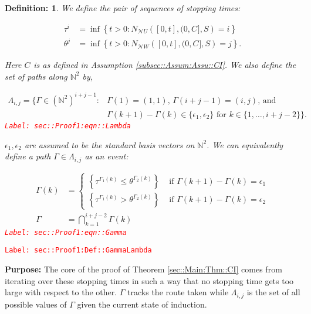 \documentclass[12pt]{article}
\newcommand{\mb}{\mathbb}
\newcommand{\mc}{\mathcal}
\newcommand{\te}{\text}
\newcommand{\ep}{\epsilon}
\newcommand{\tr}{\textcolor{red}}
\newcommand{\labe}[1]{\tr{\texttt{Label: #1}}}
\newcommand{\purpose}{\textbf{Purpose: }}
\newcommand{\neigh}{\mc{N}}					%
\renewcommand{\U}{U}							%
\newcommand{\UU}{W}								%
\renewcommand{\S}{S}							%
\newcommand{\ev}[1]{\ep_{#1}}					%
\renewcommand{\t}{t}							%
\newcommand{\poiss}[1]{N_{#1}}						%
\newcommand{\rt}[1]{\tau^{#1}}						%
\newcommand{\rtt}[1]{\theta^{#1}}					%
\renewcommand{\it}{k}								%
\newcommand{\itt}{i}								%
\newcommand{\ittt}{j}								%
\newcommand{\const}[1]{C_{#1}}						%
\newcommand{\apath}{\Gamma}						%
\newcommand{\pathset}[2]{\Lambda_{#1,#2}}			%
\newtheorem{defn}[thms]{Definition: }
\begin{document}
\begin{defn}
We define the pair of sequences of stopping times:

\begin{align*}
\rt{\itt} &= \inf \left\{\t > 0: \poiss{\neigh{\U}}\left([0,\t],(0,\const{}],\S\right) = \itt\right\}\\
\rtt{\ittt} &= \inf \left\{\t > 0: \poiss{\neigh{\UU}}\left([0,\t],(0,\const{}],\S\right) = \ittt\right\}.
\end{align*}

Here \(\const{}\) is as defined in Assumption \ref{subsec::Assum:Assu::CI}. We also define the set of paths along \(\mb{N}^2\) by,

\begin{align}
\pathset{\itt}{\ittt} = \{\apath \in (\mb{N}^2)^{\itt+\ittt-1}: &\apath(1) = (1,1)\te{, } \apath(\itt+\ittt-1) = (\itt,\ittt)\te{, and } \nonumber\\
&\Gamma(\it+1) - \Gamma(\it)\in \{\ev{1},\ev{2}\}\te{ for }\it\in \{1,\dots, \itt+\ittt-2\}\}.
\label{sec::Proof1:eqn::Lambda}
\end{align}
\labe{sec::Proof1:eqn::Lambda}

\(\ev{1},\ev{2}\) are assumed to be the standard basis vectors on \(\mb{N}^2\). We can equivalently define a path \(\apath \in \pathset{\itt}{\ittt}\) as an event:

\begin{align}
\apath(\it) &= \begin{cases}
\left\{\rt{\apath_1(\it)} \leq \rtt{\apath_2(\it)}\right\} &\te{ if } \apath(\it+1) - \apath(\it) = \ev{1}\\
\left\{\rt{\apath_1(\it)} > \rtt{\apath_2(\it)}\right\} &\te{ if } \apath(\it+1) - \apath(\it) = \ev{2}
\end{cases}\\
\apath &= \bigcap_{\it=1}^{\itt+\ittt-2} \apath(\it)
\label{sec::Proof1:eqn::Gamma}
\end{align}
\labe{sec::Proof1:eqn::Gamma}
\label{sec::Proof1:Def::GammaLambda}
\end{defn}
\labe{sec::Proof1:Def::GammaLambda}

\purpose The core of the proof of Theorem \ref{sec::Main:Thm::CI} comes from iterating over these stopping times in such a way that no stopping time gets too large with respect to the other. \(\apath\) tracks the route taken while \(\pathset{\itt}{\ittt}\) is the set of all possible values of \(\apath\) given the current state of induction.
\end{document}
